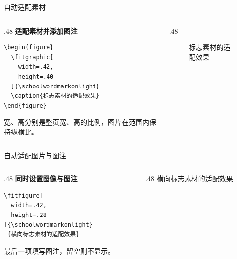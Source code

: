 \begin{frame}[fragile]{自动适配素材}
      \begin{columns}[T,onlytextwidth]
            \begin{column}{.48\textwidth}
                  \textbf{适配素材并添加图注}
                  \begin{verbatim}
\begin{figure}
  \fitgraphic[
    width=.42,
    height=.40
  ]{\schoolwordmarkonlight}
  \caption{标志素材的适配效果}
\end{figure}
                  \end{verbatim}
                  宽、高分别是整页宽、高的比例，图片在范围内保持纵横比。
            \end{column}
            \begin{column}{.48\textwidth}
                  \begin{figure}
                        \fitgraphic[width=.42,height=.40]{\schoolwordmarkonlight}
                        \caption{标志素材的适配效果}
                  \end{figure}
            \end{column}
      \end{columns}
\end{frame}

\begin{frame}[fragile]{自动适配图片与图注}
      \begin{columns}[T,onlytextwidth]
            \begin{column}{.48\textwidth}
                  \textbf{同时设置图像与图注}
                  \begin{verbatim}
\fitfigure[
  width=.42,
  height=.28
]{\schoolwordmarkonlight}
 {横向标志素材的适配效果}
                  \end{verbatim}
                  最后一项填写图注，留空则不显示。
            \end{column}
            \begin{column}{.48\textwidth}
                  \fitfigure[width=.42,height=.28]{\schoolwordmarkonlight}%
                        {横向标志素材的适配效果}
            \end{column}
      \end{columns}
\end{frame}

